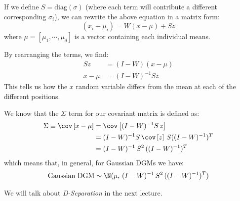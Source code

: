 \documentclass{article}
\begin{document}
If we define $S = \mathrm{diag} (\sigma)$ (where each term will contribute a different corresponding $\sigma_i$), we can rewrite the above equation in a matrix form:
\[
(x_i - \mu_i) = W(x-\mu) + S z
\]
where $\mu = \left[ \mu_1, \cdots, \mu_d\right]$ is a vector containing each individual means.

By rearranging the terms, we find:
\begin{align*}
S z &= (I - W) (x - \mu)\\
x - \mu &= (I-W)^{-1} S z 
\end{align*}
This tells us how the $x$ random variable differs from the mean at each of the different positions.

We know that the $\Sigma$ term for our covariant matrix is defined as:
\begin{align*} 
\Sigma \equiv \cov \left[x - \mu \right] &= \cov \left[ (I - W)^{-1} S \,z \right] \\
&= (I - W)^{-1} S \, \cov \left[ z \right] \, S ((I-W)^{-1})^T\\
&= (I - W)^{-1} \, S^2 \, ((I-W)^{-1})^T
\end{align*}
which means that, in general, for Gaussian DGMs we have:
\[
\text{Gaussian DGM} \sim \N(\mu,\, (I - W)^{-1} \, S^2 \,  ((I-W)^{-1})^T)
\]
\begin{remark}
We will talk about \emph{D-Separation} in the next lecture.
\end{remark}
\end{document}
